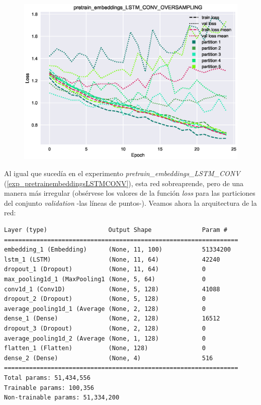 \documentclass[11pt]{article}
\begin{document}
\begin{figure}[H]
\includegraphics[width=\linewidth]{images/loss/pretrain_embeddings_LSTM_CONV_OVERSAMPLING-1554388456.eps}
\end{figure}

Al igual que sucedía en el experimento \textit{pretrain\_embeddings\_LSTM\_CONV} (\ref{exp_pretrainembeddingsLSTMCONV}), esta red sobreaprende, pero de una manera más irregular (obsérvese los valores de la función \textit{loss} para las particiones del conjunto \textit{validation} -las líneas de puntos-). Veamos ahora la arquitectura de la red:

\begin{verbatim}
Layer (type)                 Output Shape              Param #   
=================================================================
embedding_1 (Embedding)      (None, 11, 100)           51334200  
lstm_1 (LSTM)                (None, 11, 64)            42240     
dropout_1 (Dropout)          (None, 11, 64)            0         
max_pooling1d_1 (MaxPooling1 (None, 5, 64)             0         
conv1d_1 (Conv1D)            (None, 5, 128)            41088     
dropout_2 (Dropout)          (None, 5, 128)            0         
average_pooling1d_1 (Average (None, 2, 128)            0         
dense_1 (Dense)              (None, 2, 128)            16512     
dropout_3 (Dropout)          (None, 2, 128)            0         
average_pooling1d_2 (Average (None, 1, 128)            0         
flatten_1 (Flatten)          (None, 128)               0         
dense_2 (Dense)              (None, 4)                 516       
=================================================================
Total params: 51,434,556
Trainable params: 100,356
Non-trainable params: 51,334,200
\end{verbatim}
\end{document}
